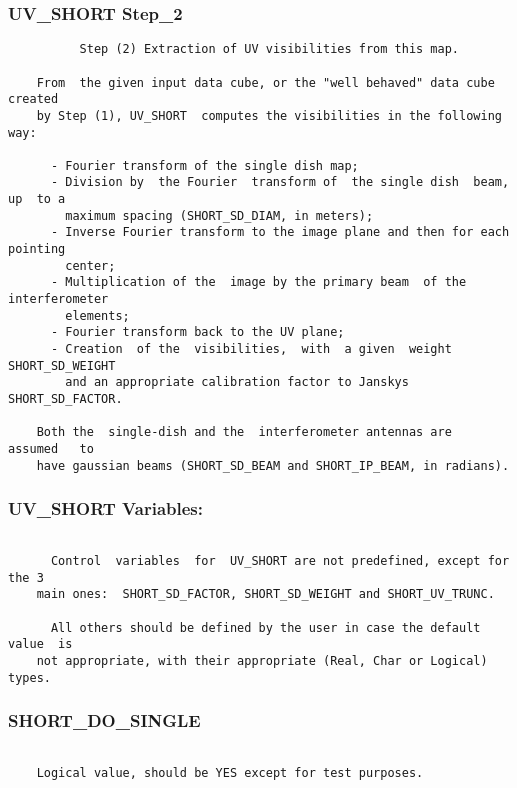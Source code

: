 \subsubsection{UV\_SHORT Step\_2}
\begin{verbatim}
          Step (2) Extraction of UV visibilities from this map.

    From  the given input data cube, or the "well behaved" data cube created
    by Step (1), UV_SHORT  computes the visibilities in the following way:

      - Fourier transform of the single dish map;
      - Division by  the Fourier  transform of  the single dish  beam, up  to a
        maximum spacing (SHORT_SD_DIAM, in meters);
      - Inverse Fourier transform to the image plane and then for each pointing
        center;
      - Multiplication of the  image by the primary beam  of the interferometer
        elements;
      - Fourier transform back to the UV plane;
      - Creation  of the  visibilities,  with  a given  weight  SHORT_SD_WEIGHT
        and an appropriate calibration factor to Janskys SHORT_SD_FACTOR.

    Both the  single-dish and the  interferometer antennas are  assumed   to
    have gaussian beams (SHORT_SD_BEAM and SHORT_IP_BEAM, in radians).

\end{verbatim}
\subsubsection{UV\_SHORT Variables:}
\begin{verbatim}

      Control  variables  for  UV_SHORT are not predefined, except for the 3
    main ones:  SHORT_SD_FACTOR, SHORT_SD_WEIGHT and SHORT_UV_TRUNC.

      All others should be defined by the user in case the default value  is
    not appropriate, with their appropriate (Real, Char or Logical) types.

\end{verbatim}
\subsubsection{SHORT\_DO\_SINGLE}
\begin{verbatim}

    Logical value, should be YES except for test purposes.

\end{verbatim}
